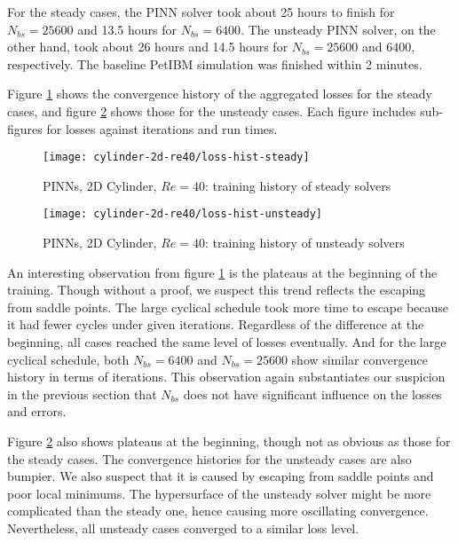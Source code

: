 
For the steady cases, the PINN solver took about 25 hours to finish for $N_{bs}=\num{25600}$ and 13.5 hours for $N_{bs}=\num{6400}$.
The unsteady PINN solver, on the other hand, took about 26 hours and 14.5 hours for $N_{bs}=\num{25600}$ and $\num{6400}$, respectively.
The baseline PetIBM simulation was finished within 2 minutes.

Figure \ref{fig:cylinder-2d-re40-loss-hist-steady} shows the convergence history of the aggregated losses for the steady cases, and figure \ref{fig:cylinder-2d-re40-loss-hist-unsteady} shows those for the unsteady cases.
Each figure includes sub-figures for losses against iterations and run times.
\begin{figure}[hbt!]
    \texttt{[image: cylinder-2d-re40/loss-hist-steady]}
    \caption[%
        PINNs, 2D Cylinder, $Re=40$: training history of steady solvers%
    ]{%
        PINNs, 2D Cylinder, $Re=40$: training history of steady solvers%
    }%
    \label{fig:cylinder-2d-re40-loss-hist-steady}
\end{figure}
\begin{figure}[hbt!]
    \texttt{[image: cylinder-2d-re40/loss-hist-unsteady]}
    \caption[%
        PINNs, 2D Cylinder, $Re=40$: training history of unsteady solvers%
    ]{%
        PINNs, 2D Cylinder, $Re=40$: training history of unsteady solvers%
    }%
    \label{fig:cylinder-2d-re40-loss-hist-unsteady}
\end{figure}
An interesting observation from figure \ref{fig:cylinder-2d-re40-loss-hist-steady} is the plateaus at the beginning of the training.
Though without a proof, we suspect this trend reflects the escaping from saddle points.
The large cyclical schedule took more time to escape because it had fewer cycles under given iterations.
Regardless of the difference at the beginning, all cases reached the same level of losses eventually.
And for the large cyclical schedule, both $N_{bs}=\num{6400}$ and $N_{bs}=\num{25600}$ show similar convergence history in terms of iterations.
This observation again substantiates our suspicion in the previous section that $N_{bs}$ does not have significant influence on the losses and errors.

Figure \ref{fig:cylinder-2d-re40-loss-hist-unsteady} also shows plateaus at the beginning, though not as obvious as those for the steady cases.
The convergence histories for the unsteady cases are also bumpier.
We also suspect that it is caused by escaping from saddle points and poor local minimums.
The hypersurface of the unsteady solver might be more complicated than the steady one, hence causing more oscillating convergence.
Nevertheless, all unsteady cases converged to a similar loss level.

